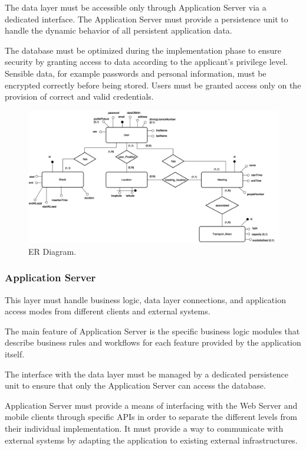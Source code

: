 \documentclass{article}
\begin{document}
	The data layer must be accessible only through Application Server via a dedicated interface. The Application Server must provide a persistence unit to handle the dynamic behavior of all persistent application data.
	
	The database must be optimized during the implementation phase to ensure security by granting access to data according to the applicant's privilege level. Sensible data, for example passwords and personal information, must be encrypted correctly before being stored. Users must be granted access only on the provision of correct and valid credentials.

	\begin{figure}[!ht]
	\centering
	\includegraphics[width=\textwidth]{img/diagrams/er.png}
	\caption{ER Diagram.}
	\end{figure}


	\subsubsection{Application Server}
	This layer must handle business logic, data layer connections, and application access modes from different clients and external systems.
	
	The main feature of Application Server is the specific business logic modules that describe business rules and workflows for each feature provided by the application itself.
	
	The interface with the data layer must be managed by a dedicated persistence unit to ensure that only the Application Server can access the database.
	
	\bigskip
	Application Server must provide a means of interfacing with the Web Server and mobile clients through specific APIs in order to separate the different levels from their individual implementation. It must provide a way to communicate with external systems by adapting the application to existing external infrastructures.
	
\end{document}
